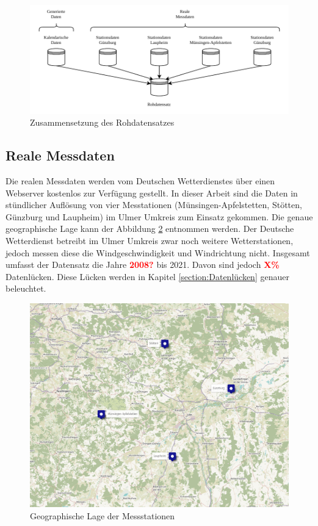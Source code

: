 \documentclass[
12pt, %
toc=listofnumbered, %
toc=chapterentrydotfill, %
numbers=noenddot, %
captions=tableheading, %
bibliography=numbered
]{scrreprt}
\let\Oldsubsection\subsection
\renewcommand{\subsection}{\FloatBarrier\Oldsubsection}
\newcommand{\highlight}[1]{\textbf{\textcolor{red}{#1}}}
\begin{document}
\begin{figure}[tph]
	\begin{center}
		\includegraphics[]{./images/rohdatensatz.pdf}
		\caption{Zusammensetzung des Rohdatensatzes}
		\label{fig:rohdatensatz}
	\end{center}
\end{figure}

\subsection{Reale Messdaten}
Die realen Messdaten werden vom Deutschen Wetterdienstes über einen Webserver kostenlos zur Verfügung gestellt. In dieser Arbeit sind die Daten in stündlicher Auflösung von vier Messtationen (Münsingen-Apfelstetten, Stötten, Günzburg und Laupheim) im Ulmer Umkreis zum Einsatz gekommen. Die genaue geographische Lage kann der Abbildung \ref{fig:map} entnommen werden. Der Deutsche Wetterdienst betreibt im Ulmer Umkreis zwar noch weitere Wetterstationen, jedoch messen diese die Windgeschwindigkeit und Windrichtung nicht. Insgesamt umfasst der Datensatz die Jahre \highlight{2008?} bis 2021. Davon sind jedoch \highlight{X\%} Datenlücken. Diese Lücken werden in Kapitel \ref{section:Datenlücken} genauer beleuchtet. 

\begin{figure}[tph]
	\begin{center}
		\includegraphics[width=\textwidth]{./images/map.png}
		\caption{Geographische Lage der Messstationen \cite{2021_OpenStreetMap-Contributors_UMap}}
		\label{fig:map}
	\end{center}
\end{figure}
\end{document}
